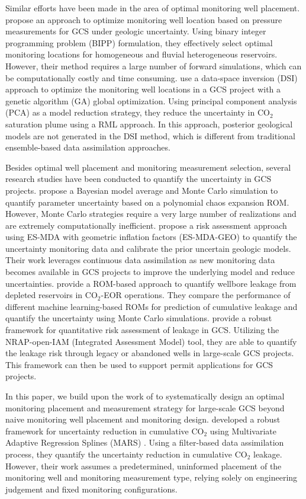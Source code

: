 \documentclass[a4paper,fleqn]{cas-sc}
\begin{document}
Similar efforts have been made in the area of optimal monitoring well placement. \citet{Sun2013} propose an approach to optimize monitoring well location based on pressure measurements for GCS under geologic uncertainty. Using binary integer programming problem (BIPP) formulation, they effectively select optimal monitoring locations for homogeneous and fluvial heterogeneous reservoirs. However, their method requires a large number of forward simulations, which can be computationally costly and time consuming. \citet{Sun2019} use a data-space inversion (DSI) approach to optimize the monitoring well locations in a GCS project with a genetic algorithm (GA) global optimization. Using principal component analysis (PCA) as a model reduction strategy, they reduce the uncertainty in CO$_2$ saturation plume using a RML approach. In this approach, posterior geological models are not generated in the DSI method, which is different from traditional ensemble-based data assimilation approaches. 

Besides optimal well placement and monitoring measurement selection, several research studies have been conducted to quantify the uncertainty in GCS projects. \citet{Jia2018104} propose a Bayesian model average and Monte Carlo simulation to quantify parameter uncertainty based on a polynomial chaos expansion ROM. However, Monte Carlo strategies require a very large number of realizations and are extremely computationally inefficient. \citet{Chen2020} propose a risk assessment approach using ES-MDA with geometric inflation factors (ES-MDA-GEO) to quantify the uncertainty monitoring data and calibrate the prior uncertain geologic models. Their work leverages continuous data assimilation as new monitoring data becomes available in GCS projects to improve the underlying model and reduce uncertainties. \citet{Mehana2022} provide a ROM-based approach to quantify wellbore leakage from depleted reservoirs in CO$_2$-EOR operations. They compare the performance of different machine learning-based ROMs for prediction of cumulative leakage and quantify the uncertainty using Monte Carlo simulations. \citet{Pawar2022} provide a robust framework for quantitative risk assessment of leakage in GCS. Utilizing the NRAP-open-IAM (Integrated Assessment Model) tool, they are able to quantify the leakage risk through legacy or abandoned wells in large-scale GCS projects. This framework can then be used to support permit applications for GCS projects. 

In this paper, we build upon the work of \citet{Chen2018} to systematically design an optimal monitoring placement and measurement strategy for large-scale GCS beyond naive monitoring well placement and monitoring design. \citet{Chen2018} developed a robust framework for uncertainty reduction in cumulative CO$_2$ using Multivariate Adaptive Regression Splines (MARS) \citep{Friedman19911}. Using a filter-based data assimilation process, they quantify the uncertainty reduction in cumulative CO$_2$ leakage. However, their work assumes a predetermined, uninformed placement of the monitoring well and monitoring measurement type, relying solely on engineering judgement and fixed monitoring configurations.
\end{document}
